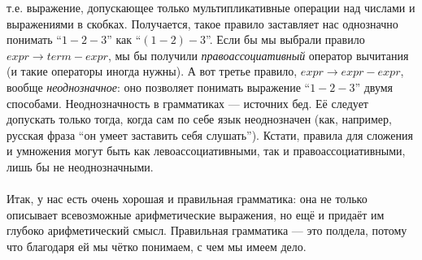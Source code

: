 \documentclass[11pt]{book}
\begin{document}
т.е. выражение, допускающее только мультипликативные операции над числами и выражениями в скобках.
Получается, такое правило заставляет нас однозначно понимать ``$1 - 2 - 3$'' как ``$(1 - 2) - 3$''.
Если бы мы выбрали правило $expr \rightarrow term - expr$, мы бы получили \emph{правоассоциативный}
оператор вычитания (и такие операторы иногда нужны). А вот третье правило, $expr \rightarrow expr - expr$,
вообще \emph{неоднозначное}: оно позволяет понимать выражение ``$1 - 2 - 3$''
двумя способами. Неоднозначность в грамматиках --- источних бед. Её следует допускать только тогда, когда
сам по себе язык неоднозначен (как, например, русская фраза ``он умеет заставить себя слушать'').
Кстати, правила для сложения и умножения могут быть как левоассоциативными, так и правоассоциативными, лишь бы не неоднозначными.
\\ \\
Итак, у нас есть очень хорошая и правильная грамматика: она не только
описывает всевозможные арифметические выражения, но ещё и придаёт им глубоко арифметический
смысл. Правильная грамматика --- это полдела, потому что благодаря ей мы
чётко понимаем, с чем мы имеем дело.
\end{document}

